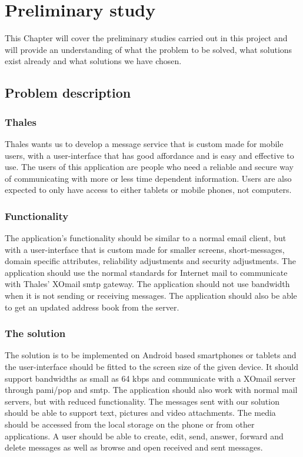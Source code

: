 \chapter{Preliminary study}

This Chapter will cover the preliminary studies carried out in this project and will provide an understanding of what the problem to be solved, what solutions exist already and what solutions we have chosen.

\section{Problem description}

\subsection{Thales}
Thales wants us to develop a message service that is custom made for mobile users, with a user-interface that has good affordance and is easy and effective to use.
\newline
\newline
The users of this application are people who need a reliable and secure way of communicating with more or less time dependent information. Users are also expected to only have access to either tablets or mobile phones, not computers.

\subsection{Functionality}
The application’s functionality should be similar to a normal email client, but with a user-interface that is custom made for smaller screens, short-messages, domain specific attributes, reliability adjustments and security adjustments. The application should use the normal standards for Internet mail to communicate with Thales’ XOmail \gls{smtp} gateway.
\newline
\newline
The application should not use bandwidth when it is not sending or receiving messages. The application should also be able to get an updated address book from the server.

\subsection{The solution}
The solution is to be implemented on Android based smartphones or tablets and the user-interface should be fitted to the screen size of the given device. It should support bandwidths as small as 64 kbps and communicate with a XOmail
server through \gls{pami}/\gls{pop} and \gls{smtp}. The application should also work with normal mail servers, but with reduced functionality.
\newline
\newline
The messages sent with our solution should be able to support text, pictures and video attachments. The media should be accessed from the local storage on the phone or from other applications. A user should be able to create, edit, send, answer, forward and delete messages as well as browse and open received and sent messages.

